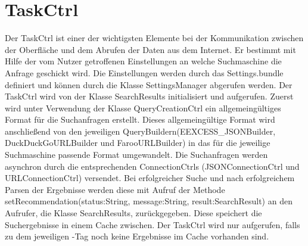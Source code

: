 
\section{TaskCtrl}

Der TaskCtrl ist einer der wichtigsten Elemente bei der Kommunikation zwischen der Oberfläche und dem Abrufen der Daten aus dem Internet. Er bestimmt mit Hilfe der vom Nutzer getroffenen Einstellungen an welche Suchmaschine die Anfrage geschickt wird. Die Einstellungen werden durch das \glqq Settings.bundle\grqq\xspace definiert und können durch die Klasse \glqq SettingsManager\grqq\xspace abgerufen werden. Der TaskCtrl wird von der Klasse \glqq SearchResults\grqq\xspace initialisiert und aufgerufen. Zuerst wird unter Verwendung der Klasse \glqq QueryCreationCtrl \grqq\xspace ein allgemeingültiges Format für die Suchanfragen erstellt. Dieses allgemeingültige Format wird anschließend von den jeweiligen \glqq QueryBuildern\grqq\xspace (EEXCESS\_JSONBuilder, DuckDuckGoURLBuilder und FarooURLBuilder) in das für die jeweilige Suchmaschine passende Format umgewandelt. Die Suchanfragen werden asynchron durch die entsprechenden \glqq ConnectionCtrls \grqq\xspace (JSONConnectionCtrl und URLConnectionCtrl) versendet. Bei erfolgreicher Suche und nach erfolgreichem Parsen der Ergebnisse werden diese mit Aufruf der Methode \glqq setRecommendation(status:String, message:String, result:SearchResult) \grqq\xspace an den Aufrufer, die Klasse SearchResults, zurückgegeben. Diese speichert die Suchergebnisse in einem Cache zwischen. Der TaskCtrl wird nur aufgerufen, falls zu dem jeweiligen \SEARCH-Tag noch keine Ergebnisse im Cache vorhanden sind. 

